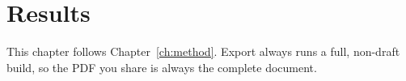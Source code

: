 \chapter{Results}\label{ch:results}
This chapter follows Chapter~\ref{ch:method}. Export always runs a full,
non-draft build, so the PDF you share is always the complete document.

\lipsum[7-9]
